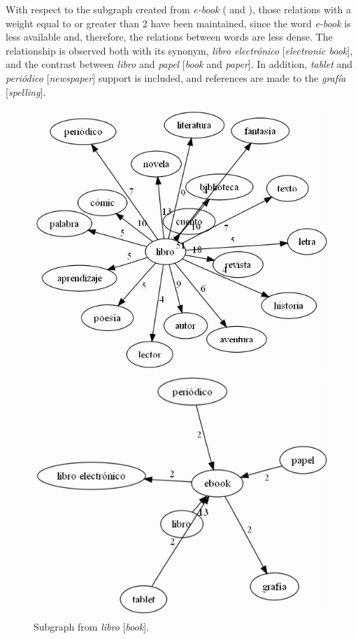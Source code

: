 \documentclass[english]{textolivre}
\begin{document}
With respect to the subgraph created from \textit{e-book} ( and ), those relations with a weight equal to or greater than 2 have been maintained, since the word \textit{e-book} is less available and, therefore, the relations between words are less dense. The relationship is observed both with its synonym, \textit{libro electrónico} [\textit{electronic book}], and the contrast between \textit{libro} and \textit{papel} [\textit{book} and \textit{paper}]. In addition, \textit{tablet} and \textit{periódico} [\textit{newspaper}] support is included, and references are made to the \textit{grafía} [\textit{spelling}].


\begin{figure}[htbp]
 \centering
 \begin{minipage}{.45\textwidth}
 \includegraphics[width=\textwidth]{Fig5.png}
 \caption{Subgraph from \textit{libro} [\textit{book}].}
 \label{fig5}
 \end{minipage}%
 \qquad
 \begin{minipage}{0.45\textwidth}
 \includegraphics[width=\textwidth]{Fig6.png}

\end{minipage}
\end{figure}
\end{document}
